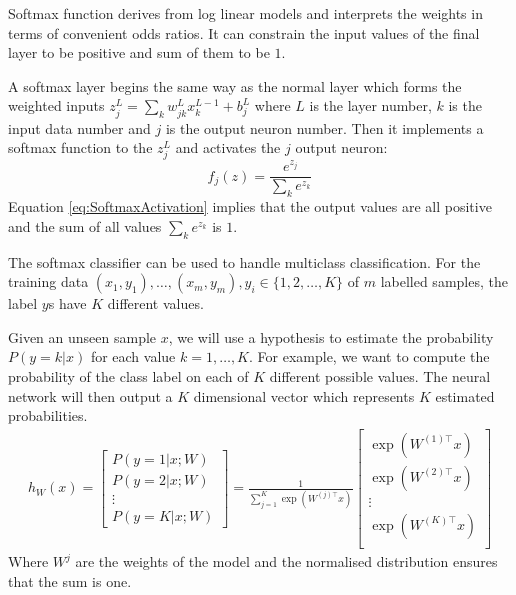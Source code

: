 Softmax function derives from log linear models and interprets the weights in terms of convenient odds ratios. It can constrain the input values of the final layer to be positive and sum of them to be $1$.

A softmax layer begins the same way as the normal layer which forms the weighted inputs $z^L_j = \sum_{k} w^L_{jk} x^{L-1}_k + b^L_j$ where $L$ is the layer number, $k$ is the input data number and $j$ is the output neuron number. Then it implements a softmax function to the $z^L_j$ and activates the $j$ output neuron:
\begin{equation}\label{eq:SoftmaxActivation}
f_j(z) = \frac{e^{z_j}}{\sum_k e^{z_k}}
\end{equation}
Equation \ref{eq:SoftmaxActivation} implies that the output values are all positive and the sum of all values $\sum_k e^{z_k}$ is $1$.

The softmax classifier can be used to handle multiclass classification. For the training data $(x_{1}, y_{1}), \ldots, (x_{m}, y_{m}), y_{i} \in \{1, 2, \ldots, K\} $ of $m$ labelled samples, the label $y$s have $K$ different values.

Given an unseen sample $x$, we will use a hypothesis to estimate the probability $P(y=k | x)$ for each value $k = 1, \ldots, K$. For example, we want to compute the probability of the class label on each of $K$ different possible values. The neural network will then output a $K$ dimensional vector which represents $K$ estimated probabilities. 
\begin{align}
h_{W}(x) =
\begin{bmatrix}
P(y = 1 | x; W) \\
P(y = 2 | x; W) \\
\vdots \\
P(y = K | x; W)
\end{bmatrix}
=
\frac{1}{ \sum_{j=1}^{K}{\exp(W^{(j)\top} x) }}
\begin{bmatrix}
\exp(W^{(1)\top} x ) \\
\exp(W^{(2)\top} x ) \\
\vdots \\
\exp(W^{(K)\top} x ) \\
\end{bmatrix}
\end{align}
Where $W^{j}$ are the weights of the model and the normalised distribution ensures that the sum is one.

